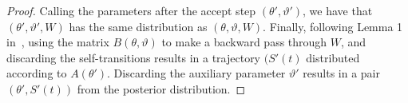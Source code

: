 \begin{proof}
Calling the parameters 
after the accept step $(\theta', \vartheta')$, we have that
$(\theta', \vartheta',W)$ has the same distribution as
$(\theta, \vartheta,W)$.
Finally, following Lemma 1 in~\cite{RaoTeh13}, using the matrix 
$B(\theta,\vartheta)$ to make a backward pass through $W$,
and discarding the self-transitions results in a trajectory $(S'(t)$
distributed according to $A(\theta')$. Discarding the auxiliary parameter
$\vartheta'$ results in a pair $(\theta',S'(t))$ from
the posterior distribution.
\end{proof}

